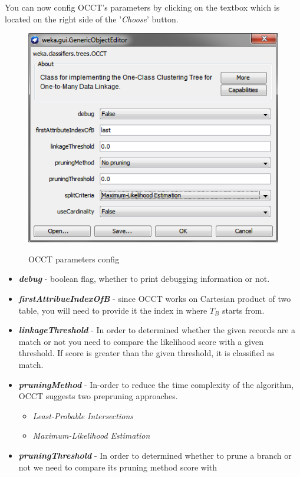 \documentclass[a4paper,12pt]{article}
\begin{document}
\begin{spacing}{1.5}
You can now config OCCT's parameters by clicking on the textbox which is located on the right side of the '{\em Choose}' button.
\clearpage
\begin{figure}[!h]
  \centering
  \includegraphics{Figures/GUI/OCCTConfig}\\
  \caption{OCCT parameters config}
  \label{fig:occtconf}
\end{figure}
\begin{itemize}
  \item \textbf{{\em debug}} - boolean flag, whether to print debugging information or not.
  \item \textbf{{\em firstAttribueIndexOfB}} - since OCCT works on Cartesian product of two table, you will need to provide it the
  index in where $T_{B}$ starts from.
  \item \textbf{{\em linkageThreshold}} - In order to determined whether the given records are a match or not you need to compare the likelihood
  score with a given threshold. If score is greater than the given threshold, it is classified as match.
  \item \textbf{{\em pruningMethod}} - In-order to reduce the time complexity of the algorithm, OCCT suggests two prepruning approaches.
  \begin{itemize}
    \item {\em Least-Probable Intersections} 
    \item {\em Maximum-Likelihood Estimation} 
  \end{itemize}
  \item \textbf{{\em pruningThreshold}} - In order to determined whether to prune a branch or not we need to compare its pruning method score with

\end{itemize}
\end{spacing}
\end{document}
